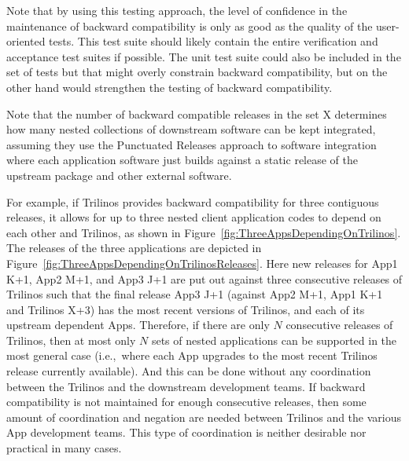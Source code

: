 \documentclass[11pt]{SANDreport}
\begin{document}
Note that by using this testing approach, the level of confidence in
the maintenance of backward compatibility is only as good as the quality
of the user-oriented tests.  This test suite
should likely contain the entire verification and acceptance test
suites if possible.  The unit test suite could also be included in the
set of tests but that might overly constrain backward compatibility,
but on the other hand would strengthen the testing of backward
compatibility.

Note that the number of backward compatible releases in the set X
determines how many nested collections of downstream software can be
kept integrated, assuming they use the Punctuated Releases approach to
software integration {}\cite{SoftwareIntegrationforCSE09} where each
application software just builds against a static release of the
upstream package and other external software.

For example, if Trilinos provides backward compatibility for three
contiguous releases, it allows for up to three nested client
application codes to depend on each other and Trilinos, as shown in
Figure~\ref{fig:ThreeAppsDependingOnTrilinos}.  The releases of the
three applications are depicted in
Figure~\ref{fig:ThreeAppsDependingOnTrilinosReleases}.  Here new
releases for App1 K+1, App2 M+1, and App3 J+1 are put out against
three consecutive releases of Trilinos such that the final release
App3 J+1 (against App2 M+1, App1 K+1 and Trilinos X+3) has the most
recent versions of Trilinos, and each of its upstream dependent Apps.
Therefore, if there are only $N$ consecutive releases of Trilinos,
then at most only $N$ sets of nested applications can be supported in
the most general case (i.e.,\ where each App upgrades to the most
recent Trilinos release currently available).  And this can be done
without any coordination between the Trilinos and the downstream
development teams.  If backward compatibility is not maintained for
enough consecutive releases, then some amount of coordination and
negation are needed between Trilinos and the various App development
teams.  This type of coordination is neither desirable nor practical
in many cases.
\end{document}
